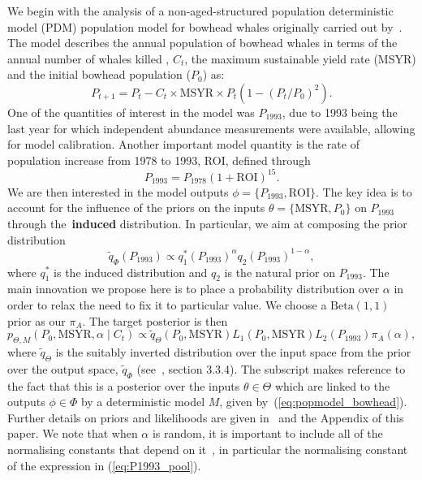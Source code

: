 \documentclass[a4paper, notitlepage, 10pt]{article}
\begin{document}
We begin with the analysis of a non-aged-structured population deterministic model (PDM) population model for bowhead whales originally carried out by~\cite{Poole2000}.
The model describes the annual population of bowhead whales in terms of the annual number of whales killed , $C_t$, the maximum sustainable yield rate (MSYR) and the initial bowhead population ($P_0$) as:
\begin{equation}
\label{eq:popmodel_bowhead}
 P_{t + 1} = P_t - C_t \times \text{MSYR} \times P_t \left( 1- (P_t/P_0)^2 \right).
\end{equation}
One of the quantities of interest in the model was $P_{\text{1993}}$, due to 1993 being the last year for which independent abundance measurements were available, allowing for model calibration.
Another important model quantity is the rate of population increase from 1978 to 1993, ROI, defined through
\begin{equation*}
 \label{eq:ROI_P1993}
P_{1993} = P_{1978}(1 + \text{ROI})^{15}. 
\end{equation*}
We are then interested in the model outputs $\phi = \{P_{1993}, \text{ROI}\}$.
The key idea is to account for the influence of the priors on the inputs $\theta = \{\text{MSYR}, P_0\}$ on $P_{1993}$ through the~\textbf{induced} distribution.
In particular, we aim at composing the prior distribution
\begin{equation}
 \label{eq:P1993_pool}
 \tilde{q}_{\Phi}(P_{1993}) \propto q_1^\ast(P_{1993})^\alpha q_2(P_{1993})^{1-\alpha},
\end{equation}
where $q_1^\ast$ is the induced distribution and $q_2$ is the natural prior on $P_{1993}$.
The main innovation we propose here is to place a probability distribution over $\alpha$ in order to relax the need to fix it to particular value.
We choose a $\text{Beta}(1, 1)$ prior as our $\pi_A$.
The target posterior is then 
\begin{equation}
 \label{eq:bowhead_posterior}
  p_{\Theta, M}(P_0, \text{MSYR}, \alpha \mid C_t) \propto \tilde{q}_{\Theta}(P_0, \text{MSYR}) L_1(P_0, \text{MSYR}) L_2(P_{1993})\pi_A(\alpha),
\end{equation}
where $\tilde{q}_{\Theta}$ is the suitably inverted distribution over the input space from the prior over the output space, $\tilde{q}_{\Phi}$ (see~\cite{Poole2000}, section 3.3.4). 
The subscript makes reference to the fact that this is a posterior over the inputs $\theta \in \Theta$ which are linked to the outputs $\phi \in \Phi$ by a deterministic model $M$, given by~(\ref{eq:popmodel_bowhead}).
Further details on priors and likelihoods are given in~\cite{Poole2000} and the Appendix of this paper.
We note that when $\alpha$ is random, it is important to include all of the normalising constants that depend on it~\citep{Neuenschwander2009}, in particular the normalising constant of the expression in (\ref{eq:P1993_pool}).
\end{document}
